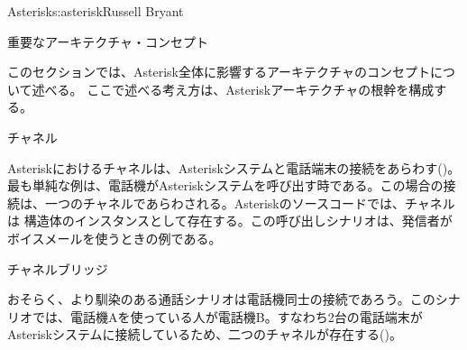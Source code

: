 \begin{aosachapter}{Asterisk}{s:asterisk}{Russell Bryant}
\begin{aosasect1}{重要なアーキテクチャ・コンセプト}

このセクションでは、Asterisk全体に影響するアーキテクチャのコンセプトについて述べる。
ここで述べる考え方は、Asteriskアーキテクチャの根幹を構成する。

\begin{aosasect2}{チャネル}

Asteriskにおけるチャネルは、Asteriskシステムと電話端末の接続をあらわす()。最も単純な例は、電話機がAsteriskシステムを呼び出す時である。この場合の接続は、一つのチャネルであらわされる。Asteriskのソースコードでは、チャネルは 構造体のインスタンスとして存在する。この呼び出しシナリオは、発信者がボイスメールを使うときの例である。


\end{aosasect2}

\begin{aosasect2}{チャネルブリッジ}

おそらく、より馴染のある通話シナリオは電話機同士の接続であろう。このシナリオでは、電話機Aを使っている人が電話機B。すなわち2台の電話端末がAsteriskシステムに接続しているため、二つのチャネルが存在する()。


\end{aosasect2}
\end{aosasect1}
\end{aosachapter}
